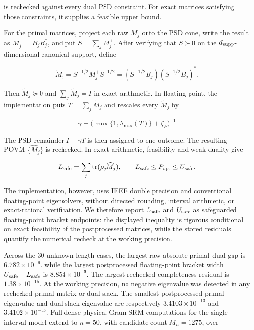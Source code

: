 is rechecked against every dual PSD constraint. For exact matrices satisfying
those constraints, it supplies a feasible upper bound.

For the primal matrices, project each raw \(M_j\) onto the PSD cone, write the
result as \(M_j^+=B_jB_j^*\), and put \(S=\sum_jM_j^+\). After verifying that
\(S\succ0\) on the \(d_{\rm supp}\)-dimensional canonical support, define

\begin{equation}\label{eq:primal-normalization}
\widetilde M_j
=S^{-1/2}M_j^+S^{-1/2}
=(S^{-1/2}B_j)(S^{-1/2}B_j)^*.
\end{equation}

Then \(\widetilde M_j\succeq0\) and
\(\sum_j\widetilde M_j=I\) in exact arithmetic. In floating point, the
implementation puts \(T=\sum_j\widetilde M_j\) and rescales every
\(\widetilde M_j\) by

\[
\gamma=\bigl(\max\{1,\lambda_{\max}(T)\}+\zeta_P\bigr)^{-1}
\]

The PSD remainder \(I-\gamma T\) is then assigned to one outcome. The resulting
POVM \(\{\widehat M_j\}\) is rechecked. In exact arithmetic, feasibility and
weak duality give

\begin{equation}\label{eq:safe-primal-bound}
L_{\rm safe}=\sum_j\operatorname{tr}(\rho_j\widehat M_j),\qquad
L_{\rm safe}\le P_{\rm opt}\le U_{\rm safe}.
\end{equation}

The implementation, however, uses IEEE double precision and conventional
floating-point eigensolvers, without directed rounding, interval arithmetic,
or exact-rational verification. We therefore report \(L_{\rm safe}\) and
\(U_{\rm safe}\) as safeguarded floating-point bracket endpoints: the displayed
inequality is rigorous conditional on exact feasibility of the postprocessed
matrices, while the stored residuals quantify the numerical recheck at the
working precision.

Across the 30 unknown-length cases, the largest raw absolute primal--dual gap
is \(6.782\times10^{-9}\), while the largest postprocessed floating-point bracket
width \(U_{\rm safe}-L_{\rm safe}\) is \(8.854\times10^{-9}\). The largest
rechecked completeness residual is \(1.38\times10^{-15}\). At the working
precision, no negative eigenvalue was detected in any rechecked primal matrix
or dual slack. The smallest postprocessed primal eigenvalue and dual slack
eigenvalue are respectively
\(3.4103\times10^{-13}\) and \(3.4102\times10^{-13}\). Full dense
physical-Gram SRM computations for the single-interval
model extend to \(n=50\), with candidate count \(M_n=1275\), over

